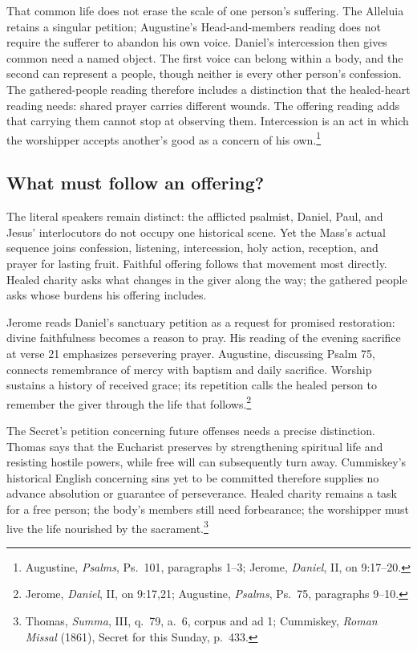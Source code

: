 That common life does not erase the scale of one person's suffering. The Alleluia retains a singular petition; Augustine's Head-and-members reading does not require the sufferer to abandon his own voice. Daniel's intercession then gives common need a named object. The first voice can belong within a body, and the second can represent a people, though neither is every other person's confession. The gathered-people reading therefore includes a distinction that the healed-heart reading needs: shared prayer carries different wounds. The offering reading adds that carrying them cannot stop at observing them. Intercession is an act in which the worshipper accepts another's good as a concern of his own.\footnote{Augustine, \textit{Psalms}, Ps.~101, paragraphs 1--3; Jerome, \textit{Daniel}, II, on 9:17--20.}

\subsection{What must follow an offering?}

The literal speakers remain distinct: the afflicted psalmist, Daniel, Paul, and Jesus' interlocutors do not occupy one historical scene. Yet the Mass's actual sequence joins confession, listening, intercession, holy action, reception, and prayer for lasting fruit. Faithful offering follows that movement most directly. Healed charity asks what changes in the giver along the way; the gathered people asks whose burdens his offering includes.

Jerome reads Daniel's sanctuary petition as a request for promised restoration: divine faithfulness becomes a reason to pray. His reading of the evening sacrifice at verse 21 emphasizes persevering prayer. Augustine, discussing Psalm 75, connects remembrance of mercy with baptism and daily sacrifice. Worship sustains a history of received grace; its repetition calls the healed person to remember the giver through the life that follows.\footnote{Jerome, \textit{Daniel}, II, on 9:17,21; Augustine, \textit{Psalms}, Ps.~75, paragraphs 9--10.}

The Secret's petition concerning future offenses needs a precise distinction. Thomas says that the Eucharist preserves by strengthening spiritual life and resisting hostile powers, while free will can subsequently turn away. Cummiskey's historical English concerning sins yet to be committed therefore supplies no advance absolution or guarantee of perseverance. Healed charity remains a task for a free person; the body's members still need forbearance; the worshipper must live the life nourished by the sacrament.\footnote{Thomas, \textit{Summa}, III, q.~79, a.~6, corpus and ad 1; Cummiskey, \textit{Roman Missal} (1861), Secret for this Sunday, p.~433.}

